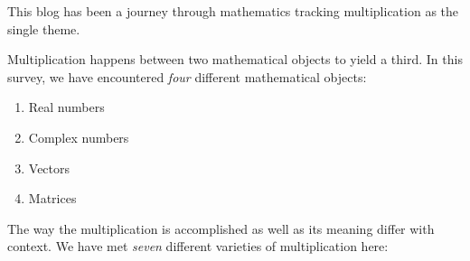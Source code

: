 \documentclass[
  a4paper,
]{article}
\providecommand{\tightlist}{%
  \setlength{\itemsep}{0pt}\setlength{\parskip}{0pt}}
\begin{document}
This blog has been a journey through mathematics tracking multiplication
as the single theme.

Multiplication happens between two mathematical objects to yield a
third. In this survey, we have encountered \emph{four} different
mathematical objects:

\begin{enumerate}
\tightlist
\item
  Real numbers
\item
  Complex numbers
\item
  Vectors
\item
  Matrices
\end{enumerate}

The way the multiplication is accomplished as well as its meaning differ
with context. We have met \emph{seven} different varieties of
multiplication here:
\end{document}
